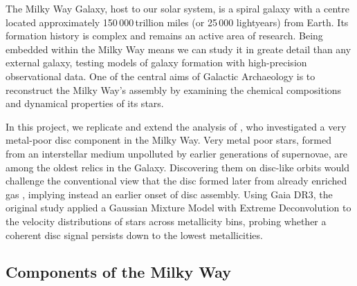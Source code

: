 \documentclass[a4paper,12pt]{article}
\begin{document}
The Milky Way Galaxy, host to our solar system, is a spiral galaxy with a centre located approximately 150\,000\,trillion miles (or 25\,000 light\-years) from Earth. Its formation history is complex and remains an active area of research. Being embedded within the Milky Way means we can study it in greate detail than any external galaxy, testing models of galaxy formation with high-precision observational data. One of the central aims of Galactic Archaeology is to reconstruct the Milky Way’s assembly by examining the chemical compositions and dynamical properties of its stars.

In this project, we replicate and extend the analysis of \citet{zhang2024existencemetalpoordiscmilky}, who investigated a very metal-poor disc component in the Milky Way. Very metal poor stars, formed from an interstellar medium unpolluted by earlier generations of supernovae, are among the oldest relics in the Galaxy. Discovering them on disc-like orbits would challenge the conventional view that the disc formed later from already enriched gas \citep{BlandHawthorn2016}, implying instead an earlier onset of disc assembly. Using Gaia DR3, the original study applied a Gaussian Mixture Model with Extreme Deconvolution to the velocity distributions of stars across metallicity bins, probing whether a coherent disc signal persists down to the lowest metallicities.

\subsection{Components of the Milky Way}
\end{document}
